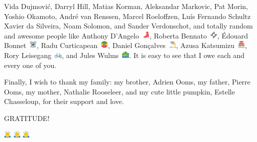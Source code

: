 Vida Dujmovi\'c,
Darryl Hill,
Matias Korman,
Aleksandar Markovic,
Pat Morin,
Yoshio Okamoto,
André van Renssen,
Marcel Roeloffzen,
Luís Fernando Schultz Xavier da Silveira,
Noam Solomon,
and
Sander Verdonschot,
%
and
%
totally random and awesome people like
Anthony D'Angelo~\includegraphics[height=1em]{figures/26f8},
Roberta Bennato~\includegraphics[height=1em]{figures/1f39e},
Édouard Bonnet~\includegraphics[height=1em]{figures/1f428},
Radu Curticapean~\includegraphics[height=1em]{figures/1f1ea-1f1f9},
Daniel Gonçalves~\includegraphics[height=1em]{figures/26f1},
Azusa Katsumizu~\includegraphics[height=1em]{figures/1f3ef},
Rory Leisegang~\includegraphics[height=1em]{figures/1f6b2},
and
Jules Wulms~\includegraphics[height=1em]{figures/26f0}.
It is easy to see that I owe each and every one of you.

Finally, I wish to thank my family:
my brother, Adrien Ooms,
my father, Pierre Ooms,
my mother, Nathalie Rooseleer,
%
and
%
my cute little pumpkin, Estelle Chasseloup,
for their support and love.

\vspace{\fill}
\centerline{\LARGE GRATITUDE!}
\vspace{\fill}
\centerline{\LARGE
\includegraphics[height=1em]{figures/1f647}
\includegraphics[height=1em]{figures/1f647}
\includegraphics[height=1em]{figures/1f647}
}
\vspace{\fill}
